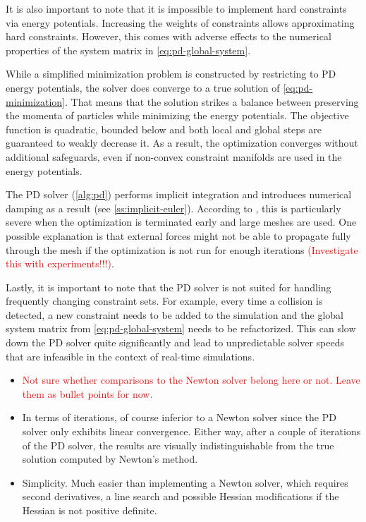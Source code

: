 It is also important to note that it is impossible to implement hard constraints via energy potentials. Increasing
the weights of constraints allows approximating hard constraints. However, this comes with adverse effects to the numerical properties of the 
system matrix in \cref{eq:pd-global-system}.

While a simplified minimization problem is constructed by restricting to PD energy potentials, the solver does converge to a 
true solution of \cref{eq:pd-minimization}. That means that the solution strikes a balance between preserving 
the momenta of particles while minimizing the energy potentials. The objective function is quadratic, bounded below and both local and 
global steps are guaranteed to weakly decrease it. As a result, the optimization converges without additional safeguards, even if 
non-convex constraint manifolds are used in the energy potentials.

The PD solver (\cref{alg:pd}) performs implicit integration and introduces numerical damping as a result (see \cref{ss:implicit-euler}).
According to \cite{bouaziz2014}, this is particularly severe when the optimization is terminated early and large meshes are used. One possible
explanation is that external forces might not be able to propagate fully through the mesh if the optimization is not run for enough iterations
\cite{bouaziz2014} \textcolor{red}{(Investigate this with experiments!!!)}.

Lastly, it is important to note that the PD solver is not suited for handling frequently changing constraint sets. For example, every time 
a collision is detected, a new constraint needs to be added to the simulation and the global system matrix from \ref{eq:pd-global-system} needs
to be refactorized. This can slow down the PD solver quite significantly and lead to unpredictable solver speeds that are infeasible in the
context of real-time simulations.

\begin{itemize}
    \item \textcolor{red}{Not sure whether comparisons to the Newton solver belong here or not. Leave them as bullet points for now.}
    \item In terms of iterations, of course inferior to a Newton solver since the PD solver only exhibits linear convergence. 
        Either way, after a couple of iterations of the PD solver, the results are visually 
        indistinguishable from the true solution computed by Newton's method.
    \item Simplicity. Much easier than implementing a Newton solver, which requires second derivatives, a line search and possible 
        Hessian modifications if the Hessian is not positive definite. 
\end{itemize}
